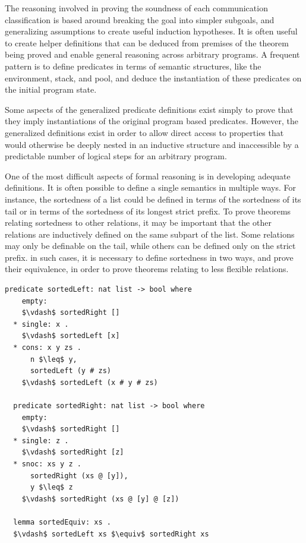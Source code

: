 \documentclass[letterpaper, 11pt]{extarticle}
\begin{document}
The reasoning involved in proving the soundness of each communication classification
is based around breaking the goal into simpler subgoals, and generalizing assumptions to create
useful induction hypotheses.  It is often useful to
create helper definitions that can be deduced
from premises of the theorem being proved and enable
general reasoning across arbitrary programs.
A frequent pattern is to define
predicates in terms of semantic structures, like the environment, stack, and pool, and deduce 
the instantiation of these predicates on the initial program state. 

Some aspects of the generalized predicate definitions exist simply to prove that they imply
instantiations of the original program based predicates. However, the generalized
definitions exist in order to allow direct access to properties that would
otherwise be deeply nested
in an inductive structure and inaccessible by a predictable number of
logical steps for an arbitrary
program.

One of the most difficult aspects of formal reasoning is in developing adequate definitions.
It is often possible to define a single semantics in multiple ways.
For instance, the sortedness of a list could be defined in terms of the sortedness of its tail
or in terms of the sortedness of its longest strict prefix. To prove theorems relating
sortedness to other relations, it may be important that the other relations are inductively
defined on the same subpart of the list. Some relations may only be definable on the tail,
while others can be defined only on the strict prefix. in such cases, it is necessary to
define sortedness in two ways, and prove their equivalence, in order to prove theorems relating
to less flexible relations.

\begin{lstlisting}[language=logic, mathescape]
  predicate sortedLeft: nat list -> bool where
    empty:
    $\vdash$ sortedRight []
  * single: x .
    $\vdash$ sortedLeft [x]
  * cons: x y zs .
      n $\leq$ y,
      sortedLeft (y # zs)
    $\vdash$ sortedLeft (x # y # zs)

  predicate sortedRight: nat list -> bool where
    empty:
    $\vdash$ sortedRight []
  * single: z .
    $\vdash$ sortedRight [z]
  * snoc: xs y z .
      sortedRight (xs @ [y]),
      y $\leq$ z 
    $\vdash$ sortedRight (xs @ [y] @ [z])

  lemma sortedEquiv: xs .
  $\vdash$ sortedLeft xs $\equiv$ sortedRight xs  
\end{lstlisting}
\end{document}
